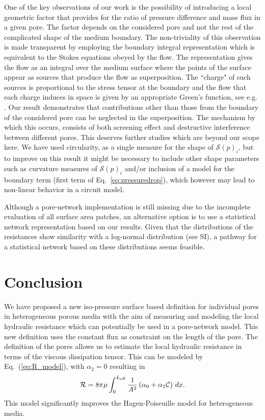 \documentclass[draft]{agujournal2019}
\begin{document}
One of the key observations of our work is the possibility of introducing a local geometric factor that provides for the ratio of pressure difference and mass flux in a given pore. The factor depends on the considered pore and not the rest of the complicated shape of the medium boundary. The non-triviality of this observation is made transparent by employing the boundary integral representation which is equivalent to the Stokes equations obeyed by the flow. The representation gives the flow as an integral over the medium surface where the points of the surface appear as sources that produce the flow as superposition. The ``charge" of such sources is proportional to the stress tensor at the boundary and the flow that each charge induces in space is given by an appropriate Green's function, see e.g. \cite{pozrikidis_boundary_1992}. Our result demonstrates that contributions other than those from the boundary of the considered pore can be neglected in the superposition. The mechanism by which this occurs, consists of both screening effect and destructive interference between different pores. This deserves further studies which are beyond our scope here. We have used circularity, as a single measure for the shape of $\mathcal{S}(p)_i$, but to improve on this result it might be necessary to include other shape parameters such as curvature measures of $\mathcal{S}(p)_i$ and/or inclusion of a model for the boundary term (first term of Eq.~\ref{eq:pressuredrop}), which however may lead to non-linear behavior in a circuit model. 

Although a pore-network implementation is still missing due to the incomplete evaluation of all surface area patches, an alternative option is to use a statistical network representation based on our results. Given that the distributions of the resistances show similarity with a log-normal distribution (see SI), a pathway for a statistical network based on these distributions seems feasible. 

\section{Conclusion}
We have proposed a new iso-pressure surface based definition for individual pores in heterogeneous porous media with the aim of measuring and modeling the local hydraulic resistance which can potentially be used in a pore-network model. This new definition uses the constant flux as constraint on the length of the pore. The definition of the pores allows us to estimate the local hydraulic resistance in terms of the viscous dissipation tensor. This can be modeled by Eq.~(\ref{eq:R_model}), with $\alpha_2=0$ resulting in  
\begin{equation}
 	\mathcal{R} = 8\pi \mu\int^{L_{\rm{eff}}}_{0}\frac{1}{A^2}\left(\alpha_0+\alpha_1\mathcal{C}\right)\,dx\label{eq:R_model}.
 \end{equation} 
This model significantly improves the Hagen-Poiseuille model for heterogeneous media. 



\end{document}
